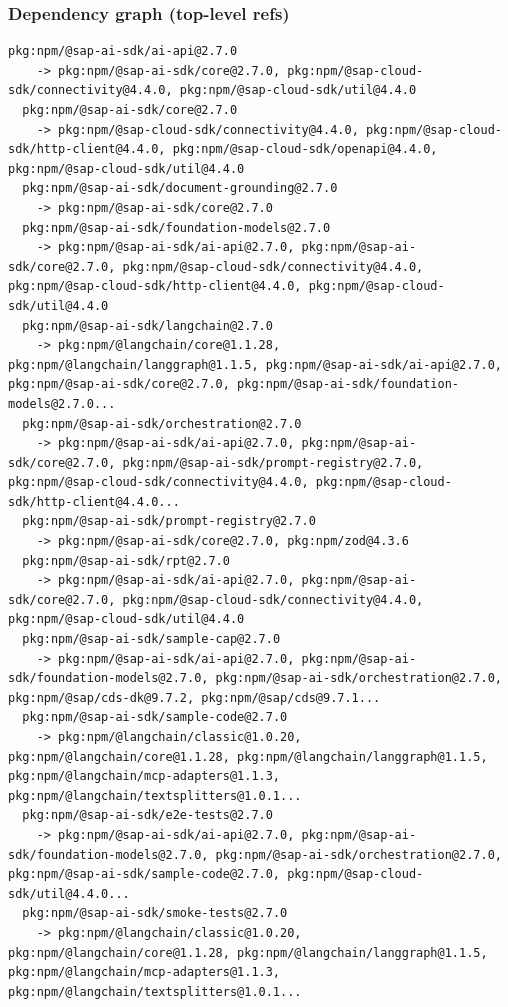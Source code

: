 \documentclass[11pt,a4paper]{article}
\begin{document}
\subsubsection*{Dependency graph (top-level refs)}
\begin{lstlisting}[style=depgraph]
  pkg:npm/@sap-ai-sdk/ai-api@2.7.0
    -> pkg:npm/@sap-ai-sdk/core@2.7.0, pkg:npm/@sap-cloud-sdk/connectivity@4.4.0, pkg:npm/@sap-cloud-sdk/util@4.4.0
  pkg:npm/@sap-ai-sdk/core@2.7.0
    -> pkg:npm/@sap-cloud-sdk/connectivity@4.4.0, pkg:npm/@sap-cloud-sdk/http-client@4.4.0, pkg:npm/@sap-cloud-sdk/openapi@4.4.0, pkg:npm/@sap-cloud-sdk/util@4.4.0
  pkg:npm/@sap-ai-sdk/document-grounding@2.7.0
    -> pkg:npm/@sap-ai-sdk/core@2.7.0
  pkg:npm/@sap-ai-sdk/foundation-models@2.7.0
    -> pkg:npm/@sap-ai-sdk/ai-api@2.7.0, pkg:npm/@sap-ai-sdk/core@2.7.0, pkg:npm/@sap-cloud-sdk/connectivity@4.4.0, pkg:npm/@sap-cloud-sdk/http-client@4.4.0, pkg:npm/@sap-cloud-sdk/util@4.4.0
  pkg:npm/@sap-ai-sdk/langchain@2.7.0
    -> pkg:npm/@langchain/core@1.1.28, pkg:npm/@langchain/langgraph@1.1.5, pkg:npm/@sap-ai-sdk/ai-api@2.7.0, pkg:npm/@sap-ai-sdk/core@2.7.0, pkg:npm/@sap-ai-sdk/foundation-models@2.7.0...
  pkg:npm/@sap-ai-sdk/orchestration@2.7.0
    -> pkg:npm/@sap-ai-sdk/ai-api@2.7.0, pkg:npm/@sap-ai-sdk/core@2.7.0, pkg:npm/@sap-ai-sdk/prompt-registry@2.7.0, pkg:npm/@sap-cloud-sdk/connectivity@4.4.0, pkg:npm/@sap-cloud-sdk/http-client@4.4.0...
  pkg:npm/@sap-ai-sdk/prompt-registry@2.7.0
    -> pkg:npm/@sap-ai-sdk/core@2.7.0, pkg:npm/zod@4.3.6
  pkg:npm/@sap-ai-sdk/rpt@2.7.0
    -> pkg:npm/@sap-ai-sdk/ai-api@2.7.0, pkg:npm/@sap-ai-sdk/core@2.7.0, pkg:npm/@sap-cloud-sdk/connectivity@4.4.0, pkg:npm/@sap-cloud-sdk/util@4.4.0
  pkg:npm/@sap-ai-sdk/sample-cap@2.7.0
    -> pkg:npm/@sap-ai-sdk/ai-api@2.7.0, pkg:npm/@sap-ai-sdk/foundation-models@2.7.0, pkg:npm/@sap-ai-sdk/orchestration@2.7.0, pkg:npm/@sap/cds-dk@9.7.2, pkg:npm/@sap/cds@9.7.1...
  pkg:npm/@sap-ai-sdk/sample-code@2.7.0
    -> pkg:npm/@langchain/classic@1.0.20, pkg:npm/@langchain/core@1.1.28, pkg:npm/@langchain/langgraph@1.1.5, pkg:npm/@langchain/mcp-adapters@1.1.3, pkg:npm/@langchain/textsplitters@1.0.1...
  pkg:npm/@sap-ai-sdk/e2e-tests@2.7.0
    -> pkg:npm/@sap-ai-sdk/ai-api@2.7.0, pkg:npm/@sap-ai-sdk/foundation-models@2.7.0, pkg:npm/@sap-ai-sdk/orchestration@2.7.0, pkg:npm/@sap-ai-sdk/sample-code@2.7.0, pkg:npm/@sap-cloud-sdk/util@4.4.0...
  pkg:npm/@sap-ai-sdk/smoke-tests@2.7.0
    -> pkg:npm/@langchain/classic@1.0.20, pkg:npm/@langchain/core@1.1.28, pkg:npm/@langchain/langgraph@1.1.5, pkg:npm/@langchain/mcp-adapters@1.1.3, pkg:npm/@langchain/textsplitters@1.0.1...

\end{lstlisting}
\end{document}
